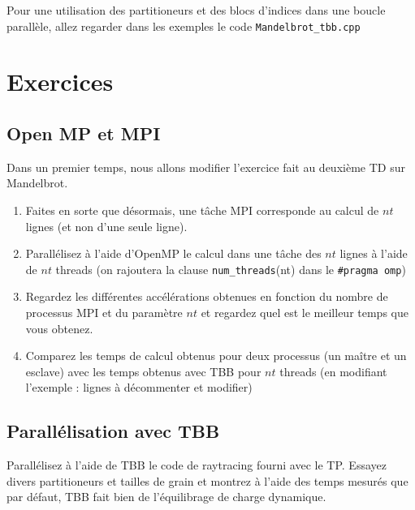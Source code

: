 \documentclass[11pt,a4paper]{article}
\begin{document}
Pour une utilisation des partitioneurs et des blocs d'indices dans une boucle
parallèle, allez regarder dans les exemples le code \texttt{Mandelbrot\_tbb.cpp}

\section{Exercices}

\subsection{Open MP et MPI}

Dans un premier temps, nous allons modifier l'exercice fait au deuxième TD sur Mandelbrot.

\begin{enumerate}
    \item Faites en sorte que désormais, une tâche MPI corresponde au calcul de $nt$ lignes
(et non d'une seule ligne).
    \item Parallélisez à l'aide d'OpenMP le calcul dans une tâche des $nt$ lignes à l'aide de 
    $nt$ threads (on rajoutera la clause \texttt{num\_threads}(nt) dans le \texttt{\#pragma omp})
    \item Regardez les différentes accélérations obtenues en fonction du nombre de processus MPI et 
    du paramètre $nt$ et regardez quel est le meilleur temps que vous obtenez.
    \item Comparez les temps de calcul obtenus pour deux processus (un maître et un esclave)
          avec les temps obtenus avec TBB pour $nt$ threads (en modifiant l'exemple : lignes à décommenter et modifier)
\end{enumerate}

\subsection{Parallélisation avec TBB}

Parallélisez à l'aide de TBB le code de raytracing fourni avec le TP.
Essayez divers partitioneurs et tailles de grain et montrez à l'aide des 
temps mesurés que par défaut, TBB fait bien de l'équilibrage de charge dynamique.
\end{document}
